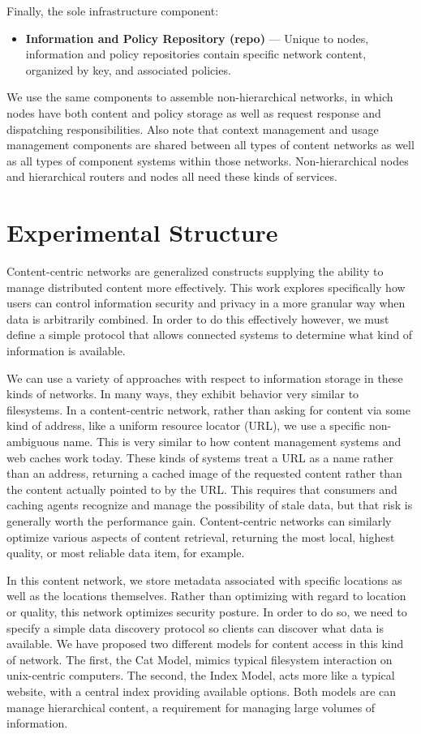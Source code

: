 Finally, the sole infrastructure component:

\begin{itemize}
\item \textbf{Information and Policy Repository (repo)} --- Unique to nodes, information and policy repositories contain specific network content, organized by key, and associated policies.
\end{itemize}

We use the same components to assemble non-hierarchical networks, in which nodes have both content and policy storage as well as request response and dispatching responsibilities.  Also note that context management and usage management components are shared between all types of content networks as well as all types of component systems within those networks.  Non-hierarchical nodes and hierarchical routers and nodes all need these kinds of services.

\section{Experimental Structure}
Content-centric networks are generalized constructs supplying the ability to manage distributed content more effectively.  This work explores specifically how users can control information security and privacy in a more granular way when data is arbitrarily combined.  In order to do this effectively however, we must define a simple protocol that allows connected systems to determine what kind of information is available.

We can use a variety of approaches with respect to information storage in these kinds of networks.  In many ways, they exhibit behavior very similar to filesystems.  In a content-centric network, rather than asking for content via some kind of address, like a uniform resource locator (URL), we use a specific non-ambiguous name.  This is very similar to how content management systems and web caches work today.  These kinds of systems treat a URL as a name rather than an address, returning a cached image of the requested content rather than the content actually pointed to by the URL.  This requires that consumers and caching agents recognize and manage the possibility of stale data, but that risk is generally worth the performance gain.  Content-centric networks can similarly optimize various aspects of content retrieval, returning the most local, highest quality, or most reliable data item, for example.

In this content network, we store metadata associated with specific locations as well as the locations themselves.  Rather than optimizing with regard to location or quality, this network optimizes security posture.  In order to do so, we need to specify a simple data discovery protocol so clients can discover what data is available.
We have proposed two different models for content access in this kind of network.  The first, the Cat Model, mimics typical filesystem interaction on unix-centric computers.  The second, the Index Model, acts more like a typical website, with a central index providing available options.  Both models are can manage hierarchical content, a requirement for managing large volumes of information.

